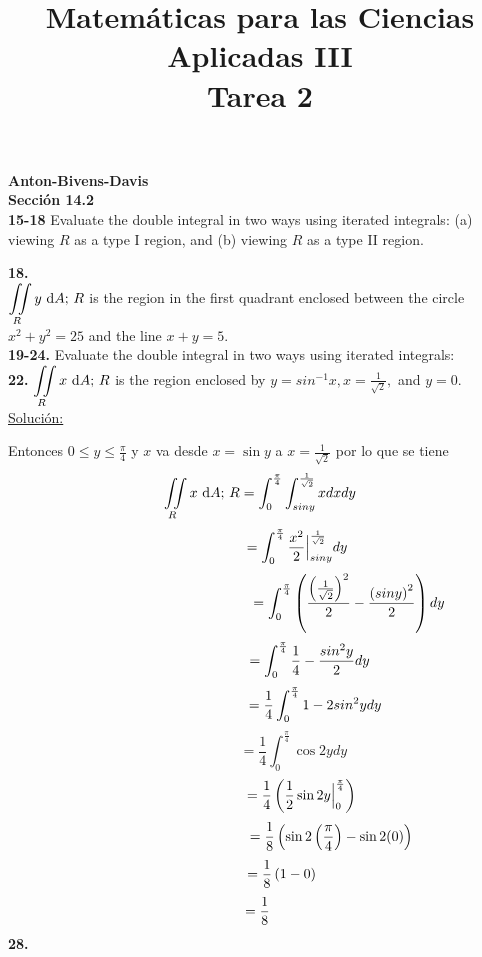\documentclass[11pt]{report}
\newcommand{\s}{\underline{Soluci\'{o}n:}}
\begin{document}
{}
\title{Matemáticas para las Ciencias Aplicadas III \\ Tarea 2}
\maketitle

\textbf{Anton-Bivens-Davis} \\

\textbf{Sección 14.2} \\

\textbf{15-18} Evaluate the double integral in two ways using iterated integrals:
(a) viewing $R$ as a type I region, and (b) viewing $R$ as a type II region.

\textbf{18.} \\

$ {\displaystyle \iint \limits_R } \, y \, \, \text dA; \, R$ is the region in
the first quadrant enclosed between the circle $x^2 + y^2 = 25$ and the line
$x + y = 5$. \\

\textbf{19-24.} Evaluate the double integral in two ways using iterated
integrals: \\

\textbf{22.} $ {\displaystyle \iint \limits_R } \, x \, \, \text dA; \, R$
is the region enclosed by $y = sin^{-1} x, x = \frac{1}{\sqrt{2}},$ and $y = 0$.
\\

\s

Entonces $0 \leq y \leq \frac{\pi}{4}$ y $x$ va desde
$x = \sin y$ a $ x = \frac{1}{\sqrt{2}}$  por lo que se tiene
\[{\displaystyle \iint \limits_R } \, x \, \, \text dA; \, R =
\int^{\frac{\pi}{4}}_{0}\int^{\frac{1}{\sqrt{2}}}_{sin y} x dx dy\]
\[\hspace{1.9cm}= \int^{\frac{\pi}{4}}_{0} \frac{x^2}{2} \Big|^{\frac{1}{\sqrt{2}}}_{sin y} dy \]
\[\hspace{4.5cm}= \int^{\frac{\pi}{4}}_{0} \left(\frac{\left(\frac{1}{\sqrt{2}}\right)^2}{2}
- \frac{\left(sin y\right)^2}{2} \right) dy \]
\[\hspace{2.5cm}= \int^{\frac{\pi}{4}}_{0} \frac{1}{4} - \frac{sin^2y}{2} dy\]
\[\hspace{2.8cm}= \frac{1}{4}\int^{\frac{\pi}{4}}_{0} 1 - 2 sin^2y dy\]
\[\hspace{2cm}= \frac{1}{4}\int^{\frac{\pi}{4}}_{0} \cos 2y dy \]
\[\hspace{2.1cm}= \frac{1}{4}\left(\frac{1}{2}\sin2y\Big|^{\frac{\pi}{4}}_{0}\right)\]
\[\hspace{3.6cm}= \frac{1}{8}\left(\sin2\left(\frac{\pi}{4}\right) - \sin2(0)\right)\]
\[\hspace{1.1cm}= \frac{1}{8}\left(1 - 0\right)\]
\[\hspace{-0.1cm}= \frac{1}{8}\]
\textbf{28.} \\
\end{document}

